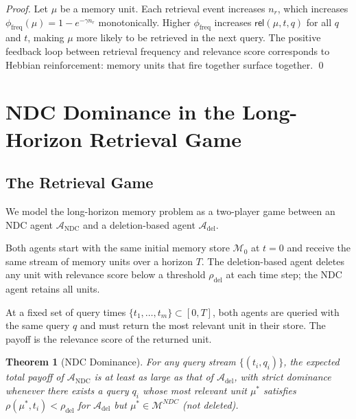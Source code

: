\documentclass[12pt]{article}
\newtheorem{theorem}{Theorem}
\newcommand{\MEM}{\mathcal{M}}
\newcommand{\REL}{\mathsf{rel}}
\begin{document}
\begin{proof}
  Let $\mu$ be a memory unit.  Each retrieval event increases $n_r$, which
  increases $\phi_\text{freq}(\mu) = 1 - e^{-\gamma n_r}$ monotonically.
  Higher $\phi_\text{freq}$ increases $\REL(\mu, t, q)$ for all $q$ and $t$,
  making $\mu$ more likely to be retrieved in the next query.  The positive
  feedback loop between retrieval frequency and relevance score corresponds
  to Hebbian reinforcement: memory units that fire together surface together. \qed
\end{proof}

\section{NDC Dominance in the Long-Horizon Retrieval Game}
\label{sec:game}

\subsection{The Retrieval Game}

We model the long-horizon memory problem as a two-player game between an
NDC agent $\mathcal{A}_\text{NDC}$ and a deletion-based agent
$\mathcal{A}_\text{del}$.

Both agents start with the same initial memory store $\MEM_0$ at $t = 0$ and
receive the same stream of memory units over a horizon $T$.  The deletion-based
agent deletes any unit with relevance score below a threshold $\rho_\text{del}$
at each time step; the NDC agent retains all units.

At a fixed set of query times $\{t_1, \ldots, t_m\} \subset [0, T]$, both
agents are queried with the same query $q$ and must return the most relevant
unit in their store.  The payoff is the relevance score of the returned unit.

\begin{theorem}[NDC Dominance]
  \label{thm:dominance}
  For any query stream $\{(t_i, q_i)\}$, the expected total payoff of
  $\mathcal{A}_\text{NDC}$ is at least as large as that of $\mathcal{A}_\text{del}$,
  with strict dominance whenever there exists a query $q_i$ whose most
  relevant unit $\mu^*$ satisfies $\rho(\mu^*, t_i) < \rho_\text{del}$ for
  $\mathcal{A}_\text{del}$ but $\mu^* \in \MEM^{NDC}$ (not deleted).
\end{theorem}
\end{document}

